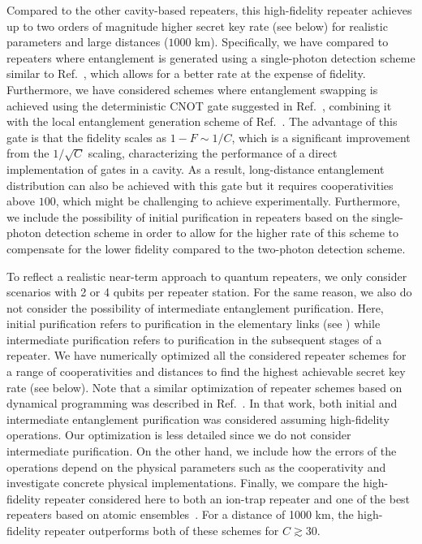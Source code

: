 Compared to the other cavity-based repeaters, this high-fidelity repeater
achieves up to two orders of magnitude higher secret key rate (see below) for
realistic parameters and large distances ($1000$ km). Specifically, we have
compared to repeaters where entanglement is generated using a single-photon
detection scheme similar to Ref.~\cite{huelga}, which allows for a better rate
at the expense of fidelity. Furthermore, we have considered schemes where
entanglement swapping is achieved using the deterministic CNOT gate suggested in
Ref.~\cite{Anders2prl}, combining it with the local entanglement generation
scheme of Ref.~\cite{Anders1prl}. The advantage of this gate is that the
fidelity scales as $1-F\sim 1/C$, which is a significant improvement from the
$1/\sqrt{C}$ scaling, characterizing the performance of a direct implementation
of gates in a cavity. As a result, long-distance entanglement distribution can
also be achieved with this gate but it requires cooperativities above $100$,
which might be challenging to achieve experimentally. Furthermore, we include
the possibility of initial purification in repeaters based on the single-photon
detection scheme in order to allow for the higher rate of this scheme to
compensate for the lower fidelity compared to the two-photon detection scheme.

To reflect a realistic near-term approach to quantum repeaters, we only consider
scenarios with 2 or 4 qubits per repeater station. For the same reason, we also
do not consider the possibility of intermediate entanglement purification. Here,
initial purification refers to purification in the elementary links (see
) while intermediate purification refers to purification in
the subsequent stages of a repeater. We have numerically optimized all the
considered repeater schemes for a range of cooperativities and distances to find
the highest achievable secret key rate (see below). Note that a similar
optimization of repeater schemes based on dynamical programming was described in
Ref.~\cite{jiang2007}. In that work, both initial and intermediate entanglement
purification was considered assuming high-fidelity operations.  Our optimization
is less detailed since we do not consider intermediate purification. On the
other hand, we include how the errors of the operations depend on the physical
parameters such as the cooperativity and investigate concrete physical
implementations.
Finally, we compare the high-fidelity repeater considered here to both an
ion-trap repeater and one of the best repeaters based on atomic
ensembles~\cite{sangouard3}. For a distance of 1000 km, the high-fidelity
repeater outperforms both of these schemes for $C\gtrsim30$.

